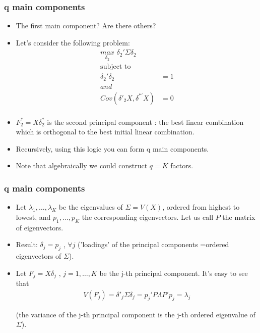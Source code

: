 \documentclass[
  shownotes,
  xcolor={svgnames},
  hyperref={colorlinks,citecolor=DarkBlue,linkcolor=DarkRed,urlcolor=DarkBlue}
  , aspectratio=169]{beamer}
\begin{document}
\begin{frame}
\frametitle{q main components}

\begin{itemize}

\item The first main component? Are there others?

\item Let's consider the following problem:
\begin{align}
\underset{\delta_2}{max}\,\, \delta_2' \Sigma \delta_2 \\ \nonumber
\text{subject to}  \\ \nonumber
\delta_2' \delta_2 &= 1 \\ \nonumber
and \\ \nonumber
Cov(\delta'_2 X,\delta^{*'}X) &=0 \\ \nonumber
\end{align}

\item $F_2^*=X\delta^*_2$ is the second principal component : the best linear combination which is
orthogonal to the best initial linear combination.
\item Recursively, using this logic you can form q  main components. 
\item Note that algebraically we could construct $q = K$ factors.
\end{itemize}
\end{frame}

\begin{frame}
\frametitle{q main components}

\begin{itemize}
\item Let $\lambda_1,\dots,\lambda_K$ be the eigenvalues of $\Sigma = V(X)$, ordered from highest to lowest, and $p_1 , \dots , p_K$ the corresponding eigenvectors. Let us call $P$ the matrix of eigenvectors.
\medskip
\item Result: $\delta_j = p_j$ , $\forall j$ ('loadings' of the principal components =ordered eigenvectors of $\Sigma$).
\medskip
\item Let $F_j = X \delta_j$ , $j = 1, \dots, K$ be the j-th principal component. It's easy to see that
\begin{align}
V (F_j ) = \delta'_j \Sigma \delta_j = p_j' P\Lambda P' p_j = \lambda_j
\end{align}

(the variance of the j-th principal component is the j-th ordered eigenvalue of $\Sigma$).
\end{itemize}


\end{frame}
\end{document}
